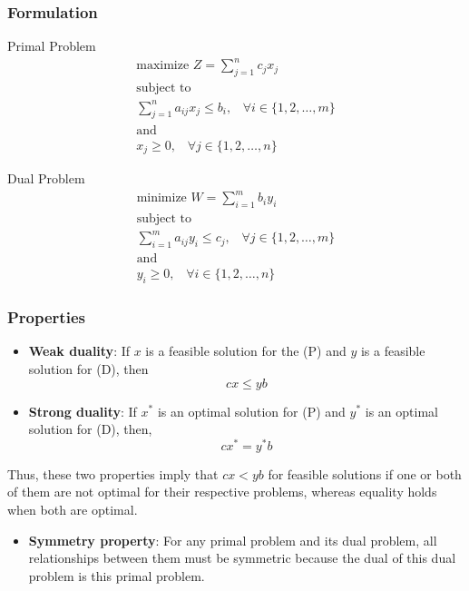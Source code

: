 \subsubsection{Formulation}
\setlength{\columnseprule}{1pt}
\begin{multicols}{2}
    Primal Problem \begin{multline*} 
        \text{maximize } Z = \sum_{j=1}^n c_jx_j \\
        \text{subject to }\\
        \sum_{j=1}^n a_{ij}x_j \leq b_i, \;\;\; \forall i \in \{1,2,\dots,m\}\\
        \text{and}\\
        x_j \geq 0, \;\;\; \forall j \in \{1,2,\dots,n\}
    \end{multline*}

    Dual Problem \begin{multline*}
        \text{minimize } W = \sum_{i=1}^m b_iy_i \\
        \text{subject to }\\
        \sum_{i=1}^m a_{ij}y_i \leq c_j, \;\;\; \forall j \in \{1,2,\dots,m\}\\
        \text{and}\\
        y_i \geq 0, \;\;\; \forall i \in \{1,2,\dots,n\}
    \end{multline*}
\end{multicols}

\subsubsection{Properties}
\begin{itemize}
    \item \textbf{Weak duality}: If $x$ is a feasible solution for the (P) and $y$ is a feasible solution for (D), then
    \[ cx \leq yb \]
    \item \textbf{Strong duality}: If $x^*$ is an optimal solution for (P) and $y^*$ is an optimal solution for (D), then,
    \[ cx^* = y^*b \]
\end{itemize}
Thus, these two properties imply that $cx < yb$ for feasible solutions if one or both of them
are not optimal for their respective problems, whereas equality holds when both are optimal.

\begin{itemize}
    \item \textbf{Symmetry property}: For any primal problem and its dual problem, all relationships between them must be 
    symmetric because the dual of this dual problem is this primal problem.
\end{itemize}


